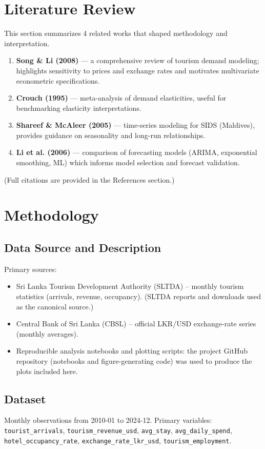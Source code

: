 \documentclass[12pt,a4paper]{article}
\begin{document}
\section{Literature Review}
This section summarizes 4 related works that shaped methodology and interpretation.

\begin{enumerate}
  \item \textbf{Song \& Li (2008)} — a comprehensive review of tourism demand modeling; highlights sensitivity to prices and exchange rates and motivates multivariate econometric specifications.
  \item \textbf{Crouch (1995)} — meta-analysis of demand elasticities, useful for benchmarking elasticity interpretations.
  \item \textbf{Shareef \& McAleer (2005)} — time-series modeling for SIDS (Maldives), provides guidance on seasonality and long-run relationships.
  \item \textbf{Li et al. (2006)} — comparison of forecasting models (ARIMA, exponential smoothing, ML) which informs model selection and forecast validation.
\end{enumerate}

(Full citations are provided in the References section.)

\section{Methodology}
\subsection{Data Source and Description}
Primary sources:
\begin{itemize}
  \item Sri Lanka Tourism Development Authority (SLTDA) -- monthly tourism statistics (arrivals, revenue, occupancy). (SLTDA reports and downloads used as the canonical source.)
  \item Central Bank of Sri Lanka (CBSL) -- official LKR/USD exchange-rate series (monthly averages).
  \item Reproducible analysis notebooks and plotting scripts: the project GitHub repository (notebooks and figure-generating code) was used to produce the plots included here.
\end{itemize}

\subsection{Dataset}
Monthly observations from 2010-01 to 2024-12. Primary variables:
\texttt{tourist\_arrivals}, \texttt{tourism\_revenue\_usd}, \texttt{avg\_stay}, \texttt{avg\_daily\_spend}, \texttt{hotel\_occupancy\_rate}, \texttt{exchange\_rate\_lkr\_usd}, \texttt{tourism\_employment}.
\end{document}
